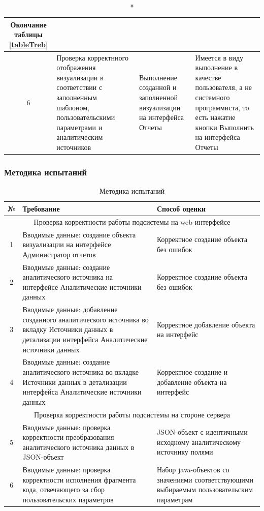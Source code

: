 \documentclass[a4paper]{extarticle}
\numberwithin{equation}{section}
\begin{document}
\begin{longtable}[H]{|c|p{}|p{}|p{}|}
  \caption*{Окончание таблицы \ref{tableTreb}} \\\hline
  6  & Проверка корректнного отображения визуализации в соответствии с заполненным шаблоном, пользовательскими параметрами и аналитическим источников & Выполнение созданной и заполненной визуализации на интерфейса Отчеты & Имеется в виду выполнение в качестве пользователя, а не системного программиста, то есть нажатие кнопки Выполнить на интерфейса Отчеты\\\hline
\end{longtable}\par

\newpage
\subsubsection{Методика испытаний}
\begin{longtable}[H]{|c|p{}|p{}|}
  \caption{Методика испытаний}
  \label{tableMetod} \\\hline
  №  & Требование & Способ оценки \\\hline
  \multicolumn{3}{|c|}{Проверка корректности работы подсистемы на web-интерфейсе} \\\hline
  1  & Вводимые данные: создание объекта визуализации на интерфейсе Администратор отчетов & Корректное создание объекта без ошибок \\\hline
  2  & Вводимые данные: создание аналитического источника на интерфейсе Аналитические источники данных & Корректное создание объекта без ошибок \\\hline
  3  & Вводимые данные: добавление созданного аналитического источника во вкладку Источники данных в детализации интерфейса Аналитические источники данных & Корректное добавление объекта на интерфейс \\\hline
  4  & Вводимые данные: создание аналитического источника во вкладке Источники данных в детализации интерфейса Аналитические источники данных & Корректное создание и добавление объекта на интерфейс \\\hline
  \multicolumn{3}{|c|}{Проверка корректности работы подсистемы на стороне сервера} \\\hline
  5  & Вводимые данные: проверка корректности преобразования аналитического источника данных в JSON-объект & JSON-объект с идентичными исходному аналитическому источнику полями \\\hline
  6  & Вводимые данные: проверка корректности исполнения фрагмента кода, отвечающего за сбор пользовательских параметров & Набор java-объектов со значениями соответствующими выбираемым пользовательским параметрам \\

\end{longtable}
\end{document}

